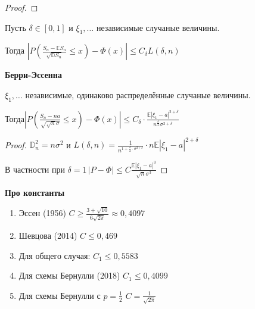 \begin{proof}
\end{proof}

\begin{theorem}
    Пусть $\delta \in [0, 1]$ и $\xi_1, \ldots$ независимые случаные величины.

    Тогда $\left | P \left( \frac{S_n - \mathbb{E} S_n}{\sqrt{\mathbb{D} S_n}} \leqslant x \right) - \Phi (x) \right | \leqslant C_{\delta} L (\delta, n)$
\end{theorem}

\begin{theorem}
    \textbf{Берри-Эссенна}

    $\xi_1, \ldots$ независимые, одинаково распределённые случаные величины.

    Тогда$\left | P \left( \frac{S_n - na}{\sqrt{\sqrt{n} \sigma}} \leqslant x \right) - \Phi (x) \right | \leqslant C_{\delta} \cdot \frac{\mathbb{E} |\xi_1 - a|^{2 + \delta}}{n^{\frac{\delta}{2}} \sigma^{2 + \delta}}$
\end{theorem}

\begin{proof}
    $\mathbb{D}_n^2 = n \sigma^2$ и $L (\delta, n) = \frac{1}{n^{1 + \frac{\delta}{2} \cdot \sigma^{2 + \delta}}} \cdot n \mathbb{E} |\xi_1 - a|^{2 + \delta}$

    В частности при $\delta = 1 \, |P - \Phi| \leqslant C \frac{\mathbb{E} |\xi_1 - a|^3}{\sqrt{n} \sigma^3}$
\end{proof}

\begin{remark}
    \textbf{Про константы}

    \begin{enumerate}
        \item {
            Эссен (1956) $C \geqslant \frac{3 + \sqrt{10}}{6 \sqrt{2 \pi}} \approx 0,4097$
        }
        \item {
            Шевцова (2014) $C \leqslant 0,469$
        }
        \item {
            Для общего случая: $C_1 \leqslant 0,5583$
        }
        \item {
            Для схемы Бернулли (2018) $C_1 \leqslant 0,4099$
        }
        \item {
            Для схемы Бернулли с $p = \frac{1}{2}$ $C = \frac{1}{\sqrt{2\pi}}$
        }
    \end{enumerate}
\end{remark}

